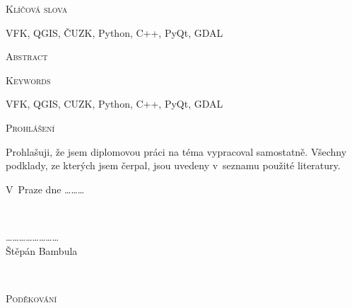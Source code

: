 \documentclass[12pt]{article}
\begin{document}
\vspace{32pt}

\noindent
\textsc{\Large Klíčová slova}

\vspace{12pt}

VFK, QGIS, ČUZK, Python, C++, PyQt, GDAL


\vfill

\noindent
\textsc{\Large Abstract}

\vspace{12pt}


\vspace{32pt}

\noindent
\textsc{\Large Keywords}

\vspace{12pt}
VFK, QGIS, CUZK, Python, C++, PyQt, GDAL


\vfill

\clearpage
\vspace*{\fill}

\noindent
\textsc{\Large Prohlášení}

\vspace{12pt}
Prohlašuji, že jsem diplomovou práci na téma  vypracoval samostatně. Všechny podklady, ze kterých jsem čerpal, jsou uvedeny v~seznamu použité literatury.

\vspace{24pt}
\noindent
\begin{minipage}{0.4\textwidth}
\begin{flushleft}
\center 
V~Praze dne \dots \dots \dots \\
\end{flushleft}
\end{minipage}
~
\begin{minipage}{0.8\textwidth}
\begin{flushright} 
\vspace{20pt}
\center
\dots \dots \dots \dots \dots \dots \dots \dots \\
Štěpán Bambula
\end{flushright}
\end{minipage}\\[2cm]


\clearpage
\vspace*{\fill}

\noindent
\textsc{\Large Poděkování}
\end{document}
